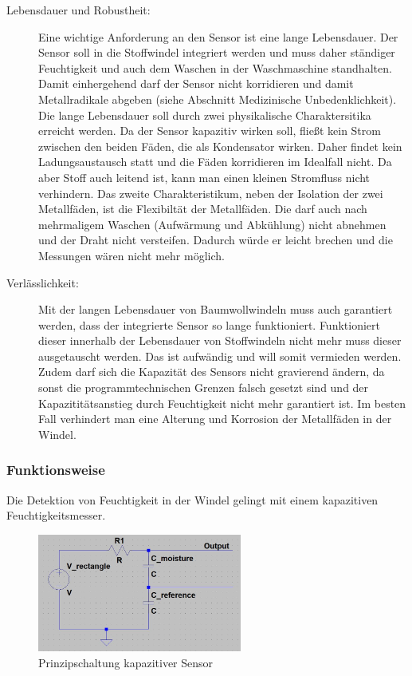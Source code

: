 \begin{description}
 \item[Lebensdauer und Robustheit:]
Eine wichtige Anforderung an den Sensor ist eine lange Lebensdauer. Der Sensor soll in die Stoffwindel integriert werden und muss daher ständiger Feuchtigkeit und auch dem Waschen in der Waschmaschine standhalten. Damit einhergehend darf der Sensor nicht korridieren und damit Metallradikale abgeben (siehe Abschnitt \glqq{}Medizinische Unbedenklichkeit\grqq{}). Die lange Lebensdauer soll durch zwei physikalische Charaktersitika erreicht werden. Da der Sensor kapazitiv wirken soll, fließt kein Strom zwischen den beiden Fäden, die als Kondensator wirken. Daher findet kein Ladungsaustausch statt und die Fäden korridieren im Idealfall nicht. Da aber Stoff auch leitend ist, kann man einen kleinen Stromfluss nicht verhindern. Das zweite Charakteristikum, neben der Isolation der zwei Metallfäden, ist die Flexibiltät der Metallfäden. Die darf auch nach mehrmaligem Waschen (Aufwärmung und Abkühlung) nicht abnehmen und der Draht nicht versteifen. Dadurch würde er leicht brechen und die Messungen wären nicht mehr möglich. 

 \item[Verlässlichkeit:]
Mit der langen Lebensdauer von Baumwollwindeln muss auch garantiert werden, dass der integrierte Sensor so lange funktioniert. Funktioniert dieser innerhalb der Lebensdauer von Stoffwindeln nicht mehr muss dieser ausgetauscht werden. Das ist aufwändig und will somit vermieden werden. Zudem darf sich die Kapazität des Sensors nicht gravierend ändern, da sonst die programmtechnischen Grenzen falsch gesetzt sind und der Kapazititätsanstieg durch Feuchtigkeit nicht mehr garantiert ist. Im besten Fall verhindert man eine Alterung und Korrosion der Metallfäden in der Windel.  
\end{description}

\subsubsection{Funktionsweise}
Die Detektion von Feuchtigkeit in der Windel gelingt mit einem kapazitiven Feuchtigkeitsmesser.

\begin{figure}[ht]
	\centering
		\includegraphics[width=0.6\textwidth]{includes/kom/graphics/cap_sensor_circuit}
	\caption{Prinzipschaltung kapazitiver Sensor}
	\label{fig:cap_sensor}
\end{figure}

